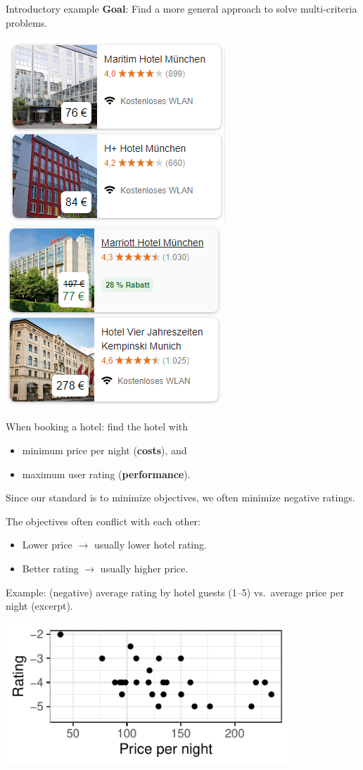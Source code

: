 \documentclass[11pt,compress,t,notes=noshow,xcolor=table]{beamer}
\begin{document}
\begin{vbframe}{Introductory example}
\bigskip
\textbf{Goal}: Find a more general approach to solve multi-criteria problems.

\begin{center}
\includegraphics[width=0.35\linewidth]{slides/11-multicrit/figure_man/booking1.png}
\quad
\includegraphics[width=0.35\linewidth]{slides/11-multicrit/figure_man/booking2.png}
\end{center}

When booking a hotel: find the hotel with
\begin{itemize}
\item minimum price per night (\textbf{costs}), and
\item maximum user rating (\textbf{performance}).
\end{itemize}

\begin{footnotesize}
Since our standard is to minimize objectives, we often minimize negative ratings.
\end{footnotesize}

\framebreak

The objectives often conflict with each other:
\begin{itemize}
\item Lower price $\to$ usually lower hotel rating.
\item Better rating $\to$ usually higher price.
\end{itemize}

Example: (negative) average rating by hotel guests (1--5) vs.\ average price per night (excerpt).

\bigskip
\begin{center}
\includegraphics[width=0.8\textwidth]{slides/11-multicrit/figure_man/expedia-1-1.pdf}
\end{center}


\end{vbframe}
\end{document}
